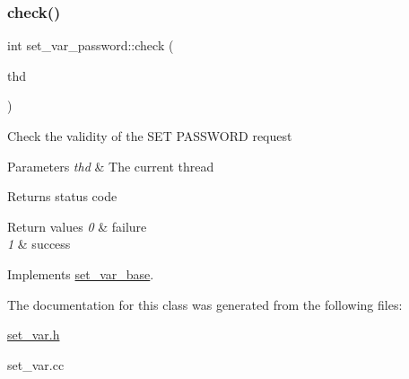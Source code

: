 \subsubsection{\texorpdfstring{check()}{check()}}
{\footnotesize\ttfamily int set\+\_\+var\+\_\+password\+::check (\begin{DoxyParamCaption}\item[{T\+HD $\ast$}]{thd }\end{DoxyParamCaption})\hspace{0.3cm}{\ttfamily [virtual]}}

Check the validity of the S\+ET P\+A\+S\+S\+W\+O\+RD request


\begin{DoxyParams}{Parameters}
{\em thd} & The current thread \\
\hline
\end{DoxyParams}
\begin{DoxyReturn}{Returns}
status code 
\end{DoxyReturn}

\begin{DoxyRetVals}{Return values}
{\em 0} & failure \\
\hline
{\em 1} & success \\
\hline
\end{DoxyRetVals}


Implements \mbox{\hyperlink{classset__var__base}{set\+\_\+var\+\_\+base}}.



The documentation for this class was generated from the following files\+:\begin{DoxyCompactItemize}
\item 
\mbox{\hyperlink{set__var_8h}{set\+\_\+var.\+h}}\item 
set\+\_\+var.\+cc\end{DoxyCompactItemize}
